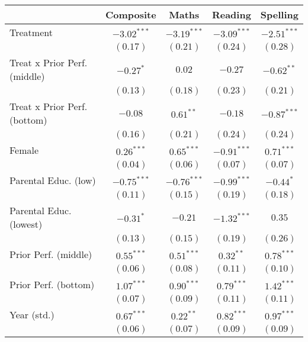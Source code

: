 
\begin{table}
\begin{center}
\begin{tabular}{l c c c c}
\hline
 & Composite & Maths & Reading & Spelling \\
\hline
Treatment                    & $-3.02^{***}$ & $-3.19^{***}$ & $-3.09^{***}$ & $-2.51^{***}$ \\
                             & $(0.17)$      & $(0.21)$      & $(0.24)$      & $(0.28)$      \\
Treat x Prior Perf. (middle) & $-0.27^{*}$   & $0.02$        & $-0.27$       & $-0.62^{**}$  \\
                             & $(0.13)$      & $(0.18)$      & $(0.23)$      & $(0.21)$      \\
Treat x Prior Perf. (bottom) & $-0.08$       & $0.61^{**}$   & $-0.18$       & $-0.87^{***}$ \\
                             & $(0.16)$      & $(0.21)$      & $(0.24)$      & $(0.24)$      \\
Female                       & $0.26^{***}$  & $0.65^{***}$  & $-0.91^{***}$ & $0.71^{***}$  \\
                             & $(0.04)$      & $(0.06)$      & $(0.07)$      & $(0.07)$      \\
Parental Educ. (low)         & $-0.75^{***}$ & $-0.76^{***}$ & $-0.99^{***}$ & $-0.44^{*}$   \\
                             & $(0.11)$      & $(0.15)$      & $(0.19)$      & $(0.18)$      \\
Parental Educ. (lowest)      & $-0.31^{*}$   & $-0.21$       & $-1.32^{***}$ & $0.35$        \\
                             & $(0.13)$      & $(0.15)$      & $(0.19)$      & $(0.26)$      \\
Prior Perf. (middle)         & $0.55^{***}$  & $0.51^{***}$  & $0.32^{**}$   & $0.78^{***}$  \\
                             & $(0.06)$      & $(0.08)$      & $(0.11)$      & $(0.10)$      \\
Prior Perf. (bottom)         & $1.07^{***}$  & $0.90^{***}$  & $0.79^{***}$  & $1.42^{***}$  \\
                             & $(0.07)$      & $(0.09)$      & $(0.11)$      & $(0.11)$      \\
Year (std.)                  & $0.67^{***}$  & $0.22^{**}$   & $0.82^{***}$  & $0.97^{***}$  \\
                             & $(0.06)$      & $(0.07)$      & $(0.09)$      & $(0.09)$      \\

\end{tabular}
\end{center}
\end{table}
